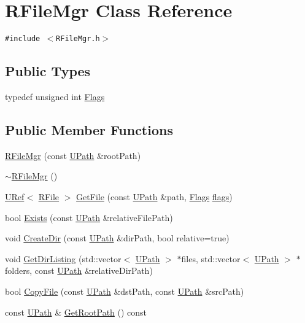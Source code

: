 \hypertarget{class_r_file_mgr}{
\section{RFileMgr Class Reference}
\label{class_r_file_mgr}
}
{\tt \#include $<$RFileMgr.h$>$}

\subsection*{Public Types}
\begin{CompactItemize}
\item 
typedef unsigned int \hyperlink{class_r_file_mgr_9ef0b4d0c3994a3aa8b0c76fe693038d}{Flags}
\end{CompactItemize}
\subsection*{Public Member Functions}
\begin{CompactItemize}
\item 
\hyperlink{class_r_file_mgr_8de8601bc8f586106709bd1ee6dc0801}{RFileMgr} (const \hyperlink{class_u_path}{UPath} \&rootPath)
\item 
\hyperlink{class_r_file_mgr_3f092fc3435b44d499a21f23d1a30adc}{$\sim$RFileMgr} ()
\item 
\hyperlink{class_u_ref}{URef}$<$ \hyperlink{class_r_file}{RFile} $>$ \hyperlink{class_r_file_mgr_d7f101aeebcb703282cfcb6c8eba67f9}{GetFile} (const \hyperlink{class_u_path}{UPath} \&path, \hyperlink{class_r_file_mgr_9ef0b4d0c3994a3aa8b0c76fe693038d}{Flags} \hyperlink{_u_t_message_8h_0a3c0b351ab09281b662a9ff4f900a53}{flags})
\item 
bool \hyperlink{class_r_file_mgr_e8ab22a950ebce68e26d4372c42e36bc}{Exists} (const \hyperlink{class_u_path}{UPath} \&relativeFilePath)
\item 
void \hyperlink{class_r_file_mgr_60eda25b74c9062989d18a118ccdb68b}{CreateDir} (const \hyperlink{class_u_path}{UPath} \&dirPath, bool relative=true)
\item 
void \hyperlink{class_r_file_mgr_d807748b4fb7900de77813bd6a7a64cd}{GetDirListing} (std::vector$<$ \hyperlink{class_u_path}{UPath} $>$ $\ast$files, std::vector$<$ \hyperlink{class_u_path}{UPath} $>$ $\ast$folders, const \hyperlink{class_u_path}{UPath} \&relativeDirPath)
\item 
bool \hyperlink{class_r_file_mgr_c3aa1b38e976cf9e75c81afb40522751}{CopyFile} (const \hyperlink{class_u_path}{UPath} \&dstPath, const \hyperlink{class_u_path}{UPath} \&srcPath)
\item 
const \hyperlink{class_u_path}{UPath} \& \hyperlink{class_r_file_mgr_0027774c5d4091aa024df4ff8aa61cfa}{GetRootPath} () const 
\end{CompactItemize}

